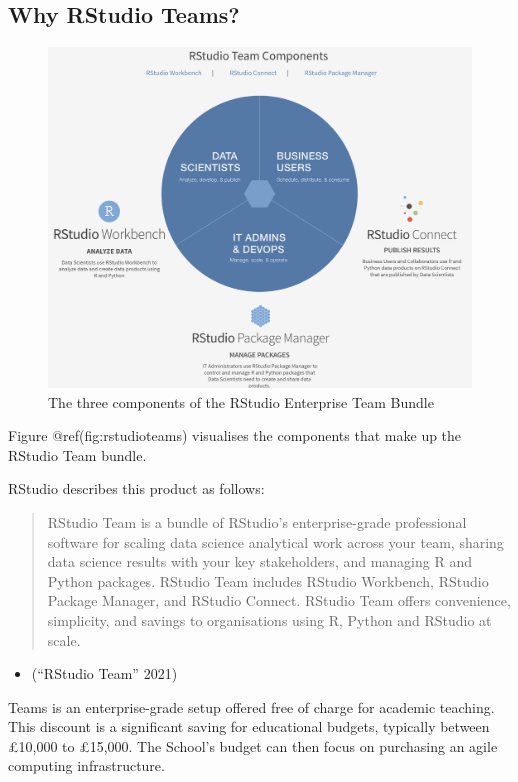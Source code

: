 \documentclass{article}
\begin{document}
\hypertarget{why-rstudio-teams}{%
\subsection{Why RStudio Teams?}\label{why-rstudio-teams}}

\begin{figure}

{\centering \includegraphics[width=0.7\linewidth]{img/Team} 

}

\caption{The three components of the RStudio Enterprise Team Bundle}\label{fig:rstudioteams}
\end{figure}

Figure @ref(fig:rstudioteams) visualises the components that make up the
RStudio Team bundle.

RStudio describes this product as follows:

\begin{quote}
RStudio Team is a bundle of RStudio's enterprise-grade professional
software for scaling data science analytical work across your team,
sharing data science results with your key stakeholders, and managing R
and Python packages. RStudio Team includes RStudio Workbench, RStudio
Package Manager, and RStudio Connect. RStudio Team offers convenience,
simplicity, and savings to organisations using R, Python and RStudio at
scale.
\end{quote}

\begin{itemize}
\tightlist
\item
  ({``{RStudio} Team''} 2021)
\end{itemize}

Teams is an enterprise-grade setup offered free of charge for academic
teaching. This discount is a significant saving for educational budgets,
typically between £10,000 to £15,000. The School's budget can then focus
on purchasing an agile computing infrastructure.
\end{document}
